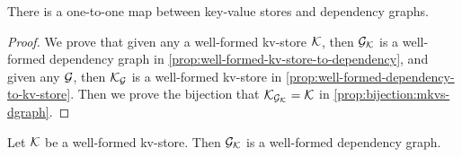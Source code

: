 \begin{theorem}
\label{thm:kv2graph}
There is a one-to-one map between key-value stores and dependency graphs.
\end{theorem}
\begin{proof}
    We prove that given any a well-formed kv-store \( \mathcal{K} \), then $\mathcal{G}_{\mathcal{K}}$ is a well-formed dependency graph in \cref{prop:well-formed-kv-store-to-dependency},
    and given any \( \mathcal{G} \), then  $\mathcal{K}_{\mathcal{G}}$ is a well-formed kv-store in \cref{prop:well-formed-dependency-to-kv-store}.
    Then we prove the bijection that $\mathcal{K}_{\mathcal{G}_{\mathcal{K}}} = \mathcal{K}$ in \cref{prop:bijection:mkvs-dgraph}.
\end{proof}



\begin{proposition}
\label{prop:well-formed-kv-store-to-dependency}
Let $\mathcal{K}$ be a well-formed kv-store. Then $\mathcal{G}_{\mathcal{K}}$ is a well-formed dependency graph.
\end{proposition}

